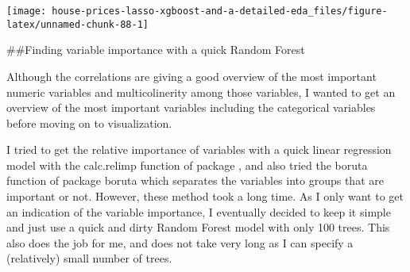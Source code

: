\documentclass[]{article}
\newenvironment{Shaded}{\begin{snugshade}}{\end{snugshade}}
\newcommand{\DataTypeTok}[1]{\textcolor[rgb]{0.13,0.29,0.53}{#1}}
\newcommand{\DecValTok}[1]{\textcolor[rgb]{0.00,0.00,0.81}{#1}}
\newcommand{\KeywordTok}[1]{\textcolor[rgb]{0.13,0.29,0.53}{\textbf{#1}}}
\newcommand{\NormalTok}[1]{#1}
\newcommand{\OperatorTok}[1]{\textcolor[rgb]{0.81,0.36,0.00}{\textbf{#1}}}
\newcommand{\OtherTok}[1]{\textcolor[rgb]{0.56,0.35,0.01}{#1}}
\newcommand{\StringTok}[1]{\textcolor[rgb]{0.31,0.60,0.02}{#1}}
\begin{document}
\texttt{[image: house-prices-lasso-xgboost-and-a-detailed-eda\_files/figure-latex/unnamed-chunk-88-1]}

\#\#Finding variable importance with a quick Random Forest

Although the correlations are giving a good overview of the most
important numeric variables and multicolinerity among those variables, I
wanted to get an overview of the most important variables including the
categorical variables before moving on to visualization.

I tried to get the relative importance of variables with a quick linear
regression model with the calc.relimp function of package , and also
tried the boruta function of package boruta which separates the
variables into groups that are important or not. However, these method
took a long time. As I only want to get an indication of the variable
importance, I eventually decided to keep it simple and just use a quick
and dirty Random Forest model with only 100 trees. This also does the
job for me, and does not take very long as I can specify a (relatively)
small number of trees.

\begin{Shaded}
\end{Shaded}
\end{document}
